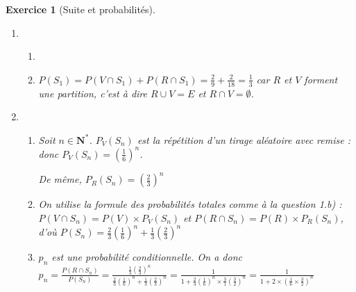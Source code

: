\documentclass[12pt,a4paper]{article}
\theoremstyle{break}
\theoremstyle{nobreak}
\newtheorem{exercice}{Exercice}
\theoremstyle{nonumberplain}
\newcommand{\N}{\mathbf{N}}
\begin{document}
\begin{exercice}[Suite et probabilités]~

  \begin{enumerate}
    \item
      \begin{enumerate}
        \item ~

          \begin{center}
          \end{center}
        \item $P(S_1) = P(V\cap S_1) + P(R\cap S_1) = \frac29 +
          \frac2{18} = \frac13$ car $R$ et $V$ forment une partition,
          c'est à dire $R\cup V = E$ et $R\cap V = \emptyset$.
      \end{enumerate}
    \item
      \begin{enumerate}
        \item Soit $n\in\N^*$. $P_V(S_n)$ est la répétition d'un tirage
          aléatoire avec remise : donc $P_V(S_n) =
          \left(\frac16\right)^n$.

          De même, $P_R(S_n) = \left(\frac23\right)^n$
        \item On utilise la formule des probabilités totales comme à la
          question 1.b) : $P(V\cap S_n) = P(V)\times P_V(S_n)$ et
          $P(R\cap S_n) = P(R)\times P_R(S_n)$, d'où $P(S_n) = \frac23
          \left(\frac16\right)^n + \frac13 \left(\frac23\right)^n$
        \item $p_n$ est une probabilité conditionnelle. On a donc $p_n =
          \frac{P(R\cap S_n)}{P(S_n)} = \frac{\frac13
          \left(\frac23\right)^n}{\frac23 \left(\frac16\right)^n +
          \frac13 \left(\frac23\right)^n} = \frac{1}{1 + \frac23
          \left(\frac16\right)^n \times \frac31 \left(\frac32
          \right)^n} = \frac1{1 + 2\times\left( \frac16 \times \frac32
          \right)^n}$


\end{enumerate}
\end{enumerate}
\end{exercice}
\end{document}
